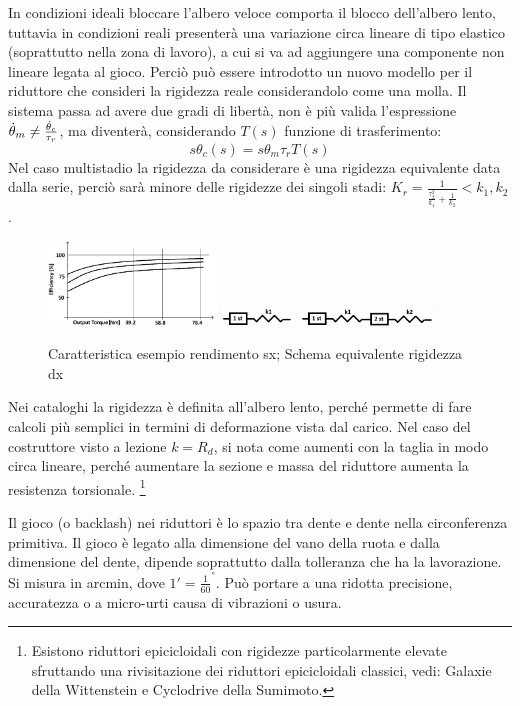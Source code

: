 In condizioni ideali bloccare l'albero veloce comporta il blocco dell'albero lento, tuttavia in condizioni reali presenterà una variazione circa lineare di tipo elastico (soprattutto nella zona di lavoro), a cui si va ad aggiungere una componente non lineare legata al gioco.
Perciò può essere introdotto un nuovo modello per il riduttore che consideri la rigidezza reale considerandolo come una molla.
Il sistema passa ad avere due gradi di libertà, non è più valida l'espressione $\dot{\theta}_m \neq \frac{\dot{\theta}_c}{\tau_r}$, ma diventerà, considerando $T(s)$ funzione di trasferimento:
\[s \theta_c(s)=s \theta_m \tau_r T(s)\]
Nel caso multistadio la rigidezza da considerare è una rigidezza equivalente data dalla serie, perciò sarà minore delle rigidezze dei singoli stadi: $K_r=\frac{1}{\frac{\tau_2^2}{k_1}+\frac{1}{k_2}}<k_1,k_2$.

\begin{figure}[h]
    \centering
    \includegraphics[width=0.4\textwidth]{Immagini/efficiency_torque.png}
    \includegraphics[width=0.5\textwidth]{Immagini/rigidezza_1_2_stadi.png}
    \caption{Caratteristica esempio rendimento sx; Schema equivalente rigidezza dx}
\end{figure}


Nei cataloghi la rigidezza è definita all'albero lento, perché permette di fare calcoli più semplici in termini di deformazione vista dal carico.
Nel caso del costruttore visto a lezione $k=R_d$, si nota come aumenti con la taglia in modo circa lineare, perché aumentare la sezione e massa del riduttore aumenta la resistenza torsionale. \footnote{Esistono riduttori epicicloidali con rigidezze particolarmente elevate sfruttando una rivisitazione dei riduttori epicicloidali classici, vedi: Galaxie della Wittenstein e Cyclodrive della Sumimoto.}

Il gioco (o backlash) nei riduttori è lo spazio tra dente e dente nella circonferenza primitiva. Il gioco è legato alla dimensione del vano della ruota e dalla dimensione del dente, dipende soprattutto dalla tolleranza che ha la lavorazione.
Si misura in arcmin, dove $1'=\frac{1}{60}^°$.
Può portare a una ridotta precisione, accuratezza o a micro-urti causa di vibrazioni o usura. 

